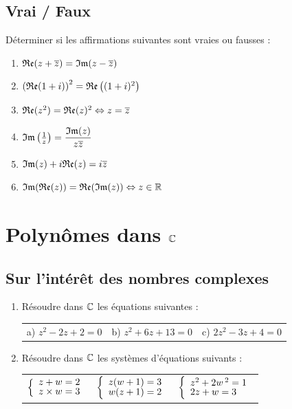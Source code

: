 \documentclass[oneside,12pt]{book}          %
\begin{document}
\subsection{Vrai / Faux}
Déterminer si les affirmations suivantes sont vraies ou fausses :
\begin{enumerate}\setlength{\itemsep}{0.5mm}
	\item ${\mathfrak{Re}}(z+{\overline{z}})={\mathfrak{Im}}(z-{\overline{z}})$
    \item $\left({\mathfrak{Re}}(1+i)\right)^2={\mathfrak{Re}}\left((1+i)^2\right)$
    \item ${\mathfrak{Re}}(z^2)={\mathfrak{Re}}(z)^2 \Leftrightarrow z={\overline{z}}$
    \item ${\mathfrak{Im}}\left(\frac{1}{z}\right)=\dfrac{{\mathfrak{Im}}(z)}{z{\overline{z}}}$
    \item ${\mathfrak{Im}}(z)+i{\mathfrak{Re}}(z)=i{\overline{z}}$
    \item ${\mathfrak{Im}}({\mathfrak{Re}}(z))={\mathfrak{Re}}({\mathfrak{Im}}(z)) \Leftrightarrow z\in{\mathbb R}$
\end{enumerate}



\section{Polynômes dans ${\mathbb C}$}

\subsection{Sur l'intérêt des nombres complexes}
\begin{enumerate}
    \item  Résoudre dans ${\mathbb C}$ les équations suivantes :
    
    \begin{tabular}{p{} p{} p{}}
        a) $z^2-2z+2=0$ & b) $z^2+6z+13=0$ & c) $2z^2-3z+4=0$
    \end{tabular}

    \item Résoudre dans ${\mathbb C}$ les systèmes d'équations suivants :

    \renewcommand{\arraystretch}{1}
    \begin{tabular}{p{} p{} p{}}
        $\accol{z+w=2\\z\times w=3}$ & $\accol{z(w+1)=3\\w(z+1)=2}$ & $\accol{z^2+2w\,^2=1\\2z+w=3}$ 
    \end{tabular}
\end{enumerate}
\end{document}
